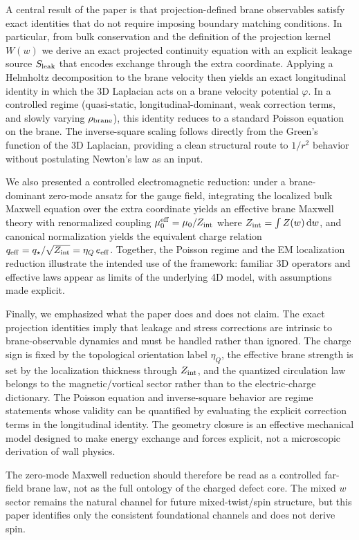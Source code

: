 \documentclass[11pt]{article}
\newcommand{\etaQ}{\eta_Q}
\newcommand{\eeff}{e_{\rm eff}}
\newcommand{\qstar}{q_\star}
\newcommand{\qeff}{q_{\rm eff}}
\newcommand{\Zint}{Z_{\rm int}}
\begin{document}
A central result of the paper is that projection-defined brane observables satisfy exact identities that do not require imposing boundary matching conditions. In particular, from bulk conservation and the definition of the projection kernel $W(w)$ we derive an exact projected continuity equation with an explicit leakage source $S_{\rm leak}$ that encodes exchange through the extra coordinate. Applying a Helmholtz decomposition to the brane velocity then yields an exact longitudinal identity in which the 3D Laplacian acts on a brane velocity potential $\varphi$. In a controlled regime (quasi-static, longitudinal-dominant, weak correction terms, and slowly varying $\rho_{\rm brane}$), this identity reduces to a standard Poisson equation on the brane. The inverse-square scaling follows directly from the Green's function of the 3D Laplacian, providing a clean structural route to $1/r^2$ behavior without postulating Newton's law as an input.

We also presented a controlled electromagnetic reduction: under a brane-dominant zero-mode ansatz for the gauge field, integrating the localized bulk Maxwell equation over the extra coordinate yields an effective brane Maxwell theory with renormalized coupling $\mu_0^{\rm eff}=\mu_0/\Zint$ where $\Zint=\int Z(w)\,\dd w$, and canonical normalization yields the equivalent charge relation $\qeff=\qstar/\sqrt{\Zint}=\etaQ\,\eeff$. Together, the Poisson regime and the EM localization reduction illustrate the intended use of the framework: familiar 3D operators and effective laws appear as limits of the underlying 4D model, with assumptions made explicit.

Finally, we emphasized what the paper does and does not claim. The exact projection identities imply that leakage and stress corrections are intrinsic to brane-observable dynamics and must be handled rather than ignored. The charge sign is fixed by the topological orientation label $\etaQ$, the effective brane strength is set by the localization thickness through $\Zint$, and the quantized circulation law belongs to the magnetic/vortical sector rather than to the electric-charge dictionary. The Poisson equation and inverse-square behavior are regime statements whose validity can be quantified by evaluating the explicit correction terms in the longitudinal identity. The geometry closure is an effective mechanical model designed to make energy exchange and forces explicit, not a microscopic derivation of wall physics.

The zero-mode Maxwell reduction should therefore be read as a controlled far-field brane law, not as the full ontology of the charged defect core. The mixed $w$ sector remains the natural channel for future mixed-twist/spin structure, but this paper identifies only the consistent foundational channels and does not derive spin.
\end{document}
